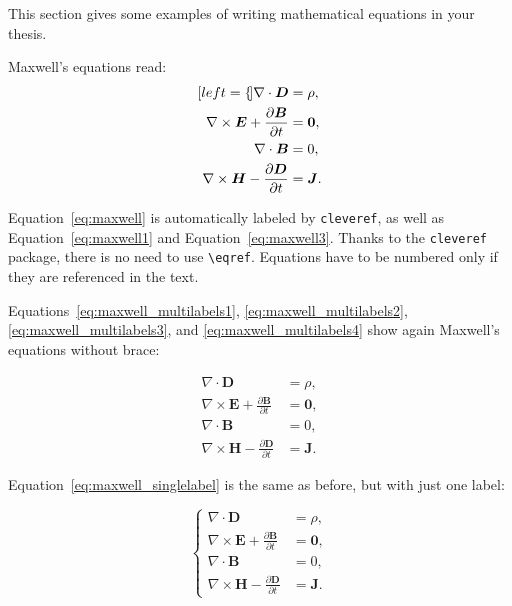\documentclass[11pt,a4paper]{article}
\begin{document}
    \label{sec:eqs}
    This section gives some examples of writing mathematical equations in your thesis.

    Maxwell's equations read:
    \begin{subequations}
        \label{eq:maxwell}
        \begin{align}[left=\empheqlbrace]
            \nabla\cdot \bm{D} & = \rho, \label{eq:maxwell1} \\
            \nabla \times \bm{E} +  \frac{\partial \bm{B}}{\partial t} & = \bm{0}, \label{eq:maxwell2} \\
            \nabla\cdot \bm{B} & = 0, \label{eq:maxwell3} \\
            \nabla \times \bm{H} - \frac{\partial \bm{D}}{\partial t} &= \bm{J}. \label{eq:maxwell4}
        \end{align}
    \end{subequations}

    Equation~\eqref{eq:maxwell} is automatically labeled by \texttt{cleveref}, as well as Equation~\eqref{eq:maxwell1} and Equation~\eqref{eq:maxwell3}. Thanks to the \verb|cleveref| package, there is no need to use \verb|\eqref|. Equations have to be numbered only if they are referenced in the text.

    Equations~\eqref{eq:maxwell_multilabels1}, \eqref{eq:maxwell_multilabels2}, \eqref{eq:maxwell_multilabels3}, and \eqref{eq:maxwell_multilabels4} show again Maxwell's equations without brace:

    \begin{align}
        \nabla\cdot \bm{D} & = \rho, \label{eq:maxwell_multilabels1} \\
        \nabla \times \bm{E} +  \frac{\partial \bm{B}}{\partial t} &= \bm{0}, \label{eq:maxwell_multilabels2} \\
        \nabla\cdot \bm{B} & = 0, \label{eq:maxwell_multilabels3} \\
        \nabla \times \bm{H} - \frac{\partial \bm{D}}{\partial t} &= \bm{J} \label{eq:maxwell_multilabels4}.
    \end{align}

    Equation~\eqref{eq:maxwell_singlelabel} is the same as before,
    but with just one label:

    \begin{equation}
        \label{eq:maxwell_singlelabel}
        \left\{
        \begin{aligned}
            \nabla\cdot \bm{D} & = \rho, \\
            \nabla \times \bm{E} +  \frac{\partial \bm{B}}{\partial t} &= \bm{0},\\
            \nabla\cdot \bm{B} & = 0, \\
            \nabla \times \bm{H} - \frac{\partial \bm{D}}{\partial t} &= \bm{J}.
        \end{aligned}
        \right.
    \end{equation}
\end{document}
